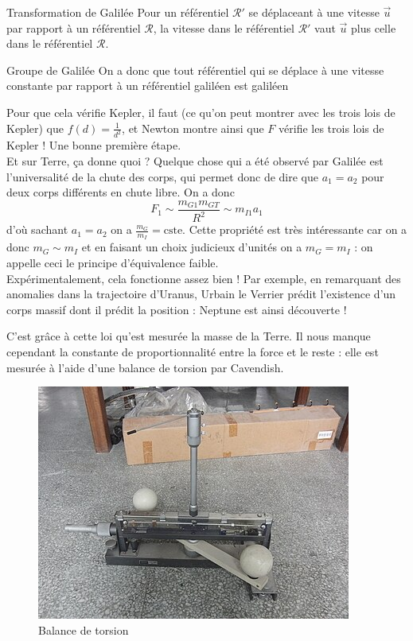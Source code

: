 \documentclass{classe}
\begin{document}
\begin{théorème}{Transformation de Galilée}{}
Pour un référentiel $\mathcal{R}'$ se déplaceant à une vitesse $\vec{u}$ par rapport à un référentiel $\mathcal{R}$, la vitesse dans le référentiel $\mathcal{R}'$ vaut $\vec{u}$ plus celle dans le référentiel $\mathcal{R}$.
\end{théorème}

\begin{remarque}{Groupe de Galilée}{}
On a donc que tout référentiel qui se déplace à une vitesse constante par rapport à un référentiel galiléen est galiléen
\end{remarque}

Pour que cela vérifie Kepler, il faut (ce qu'on peut montrer avec les trois lois de Kepler) que $f(d) = \frac{1}{d^2}$, et Newton montre ainsi que $F$ vérifie les trois lois de Kepler ! Une bonne première étape.\\

Et sur Terre, ça donne quoi ? Quelque chose qui a été observé par Galilée est l'universalité de la chute des corps, qui permet donc de dire que $a_1 = a_2$ pour deux corps différents en chute libre. On a donc
$$F_1\sim \frac{m_{G1} m_{GT}}{R^2} \sim m_{I1}a_1$$
d'où sachant $a_1 = a_2$ on a $\frac{m_G}{m_I} = \textrm{cste}$.
Cette propriété est très intéressante car on a donc $m_G\sim m_I$ et en faisant un choix judicieux d'unités on a $m_G = m_I$ : on appelle ceci le principe d'équivalence faible.\\

Expérimentalement, cela fonctionne assez bien ! Par exemple, en remarquant des anomalies dans la trajectoire d'Uranus, Urbain le Verrier prédit l'existence d'un corps massif dont il prédit la position : Neptune est ainsi découverte !

C'est grâce à cette loi qu'est mesurée la masse de la Terre. Il nous manque cependant la constante de proportionnalité entre la force et le reste : elle est mesurée à l'aide d'une balance de torsion par Cavendish.

\begin{figure}[H]
\centering
\includegraphics[scale=.7]{Cavendish.jpg}
\caption{Balance de torsion}
\end{figure}
\end{document}
